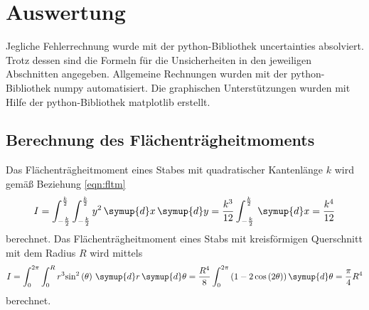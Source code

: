 \section{Auswertung}
\label{sec:Auswertung}
Jegliche Fehlerrechnung wurde mit der python-Bibliothek uncertainties \cite{uncertainties} absolviert.
Trotz dessen sind die Formeln für die Unsicherheiten in den jeweiligen Abschnitten angegeben.
Allgemeine Rechnungen wurden mit der python-Bibliothek numpy \cite{numpy} automatisiert. 
Die graphischen Unterstützungen wurden mit Hilfe der python-Bibliothek matplotlib \cite{matplotlib} erstellt.\\
\subsection{Berechnung des Flächenträgheitmoments}
Das Flächenträgheitmoment eines Stabes mit quadratischer Kantenlänge $k$ wird gemäß Beziehung \eqref{eqn:fltm}
\begin{equation}
  I = \int_{-\frac{k}{2}}^{\frac{k}{2}} \int_{-\frac{k}{2}}^{\frac{k}{2}} y^2 \, \symup{d}x\, \symup{d}y
  = \frac{k^3}{12} \int_{-\frac{k}{2}}^{\frac{k}{2}} \, \symup{d}x  = \frac{k^4}{12}
\end{equation}
berechnet.
Das Flächenträgheitmoment eines Stabs mit kreisförmigen Querschnitt mit dem Radius $R$ wird mittels
\begin{equation}
  I = \int_0^{2\pi} \int_0^R r^3  {\sin}^2 \left( \theta \right) \, \symup{d}r \, \symup{d} \theta 
  = \frac{R^4}{8} \int_0^{2\pi} \left(1-2\cos \left( 2\theta \right)\right) \symup{d} \theta = \frac{\pi}{4} R^4
\end{equation}
berechnet.
